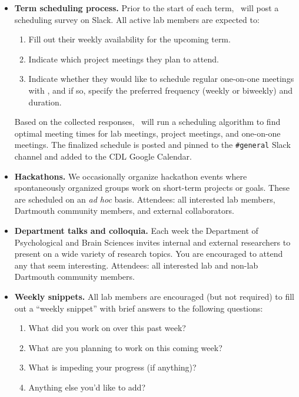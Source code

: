 \documentclass{tufte-book} %
\begin{document}
\begin{itemize}
  \item \textbf{Term scheduling process.}  Prior to the start of
  each term, \director~will post a scheduling survey on Slack.
  All active lab members are expected to:
  \begin{enumerate}
    \item Fill out their weekly availability for the upcoming term.
    \item Indicate which project meetings they plan to attend.
    \item Indicate whether they would like to schedule regular
      one-on-one meetings with \director, and if so, specify
      the preferred frequency (weekly or biweekly) and duration.
  \end{enumerate}
  Based on the collected responses, \director~will run a scheduling
  algorithm to find optimal meeting times for lab meetings, project
  meetings, and one-on-one meetings.  The finalized schedule is posted
  and pinned to the \texttt{\#general} Slack channel and added to the
  CDL Google Calendar.

  \item \textbf{Hackathons.}  We occasionally organize hackathon
    events where spontaneously organized groups work on
    short-term projects or goals.  These are
    scheduled on an \textit{ad hoc} basis.  Attendees: all interested
    lab members, Dartmouth community members, and
    external collaborators.

\item \textbf{Department talks and colloquia.} Each week the
  Department of Psychological and Brain Sciences invites internal and
  external researchers to present on a wide variety of research
  topics.  You are encouraged to attend any that seem interesting.
  Attendees: all interested lab and non-lab Dartmouth community
  members.

    \item \textbf{Weekly snippets.} All lab members are
      encouraged (but not required) to fill out a ``weekly snippet''
      with brief answers to the following questions:
      \begin{enumerate}
      \item What did you work on over this past week?
      \item What are you planning to work on this coming week?
      \item What is impeding your progress (if anything)?
      \item Anything else you'd like to add?
      \end{enumerate}


\end{itemize}
\end{document}
